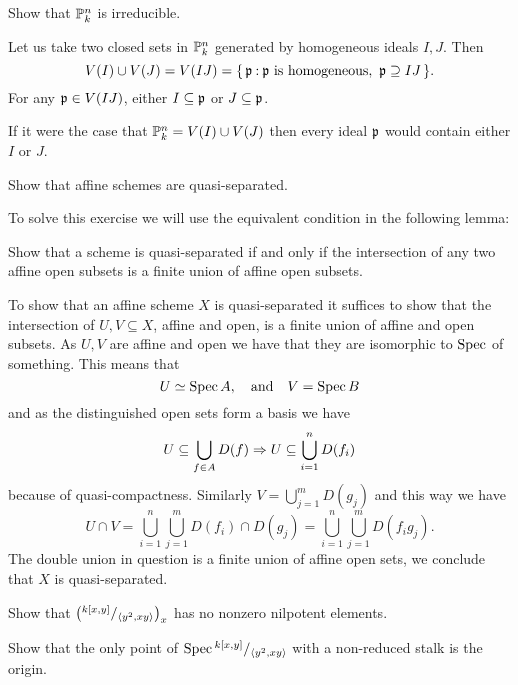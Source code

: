 \documentclass[12pt]{memoir}
\begin{document}
\begin{Ej}[5.1.A Vakil]
    Show that $\mathbb{P}^n_k$ is irreducible.
\end{Ej}

\begin{ptcbr}
Let us take two closed sets in $\mathbb{P}^n_k$ generated by homogeneous ideals $I,J$. Then 
$$V(I)\cup V(J)=V(IJ)=\{\,\mathfrak{p}\mathbin{:} \mathfrak{p} \text{ is homogeneous},\ \mathfrak{p}\supseteq IJ\,\}.$$
For any $\mathfrak{p}\in V(IJ)$, either $I\subseteq \mathfrak{p}$ or $J\subseteq \mathfrak{p}$.\par 
If it were the case that $\mathbb{P}^n_k=V(I)\cup V(J)$ then every ideal $\mathfrak{p}$ would contain either $I$ or $J$. 
\end{ptcbr}

\begin{Ej}[5.1.G Vakil]
    Show that affine schemes are quasi-separated. 
\end{Ej}

To solve this exercise we will use the equivalent condition in the following lemma:

\begin{Lem}[5.1.F Vakil]
    Show that a scheme is quasi-separated if and only if the intersection of any two affine open subsets is a finite union of affine open subsets.
\end{Lem}

\begin{ptcbr}
To show that an affine scheme $X$ is quasi-separated it suffices to show that the intersection of $U,V\subseteq X$, affine and open, is a finite union of affine and open subsets. As $U,V$ are affine and open we have that they are isomorphic to $\operatorname{Spec}$ of something. This means that 
$$U\simeq\operatorname{Spec} A,\quad\text{and}\quad V=\operatorname{Spec} B$$
and as the distinguished open sets form a basis we have 
$$U\subseteq \bigcup_{f\in A}D(f)\Rightarrow U\subseteq \bigcup_{i=1}^n D(f_i)$$
because of quasi-compactness. Similarly $V=\bigcup_{j=1}^m D(g_j)$ and this way we have 
$$U\cap V=\bigcup_{i=1}^n\bigcup_{j=1}^m D(f_i)\cap D(g_j)=\bigcup_{i=1}^n\bigcup_{j=1}^m D(f_ig_j).$$
The double union in question is a finite union of affine open sets, we conclude that $X$ is quasi-separated.
\end{ptcbr}

\begin{Ej}[5.2.D Vakil]
    Show that $\left(\quot{k[x,y]}{\genr{y^2,xy}}\right)_x$ has no nonzero nilpotent elements.
\par 
Show that the only point of
$\Spec\quot{k[x,y]}{\genr{y^2,xy}}$ with a non-reduced stalk is the origin.
\end{Ej}
\end{document}
